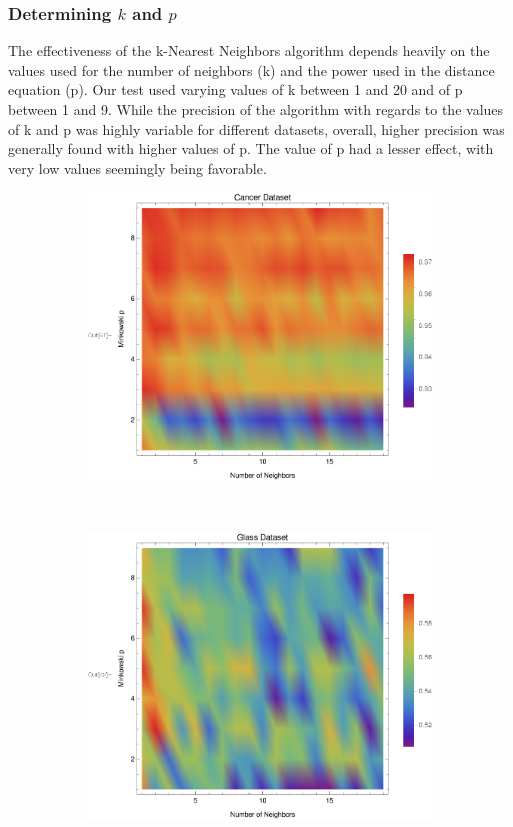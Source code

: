 \documentclass{article}
\begin{document}
		\subsubsection{Determining $k$ and $p$}
			The effectiveness of the k-Nearest Neighbors algorithm depends heavily on the values used for the number of neighbors (k) and the power used in the distance equation (p).  Our test used varying values of k between 1 and 20 and of p between 1 and 9.  While the precision of the algorithm with regards to the values of k and p was highly variable for different datasets, overall, higher precision was generally found with higher values of p.  The value of p had a lesser effect, with very low values seemingly being favorable.
			\begin{figure}[h!]
				\centering
				\begin{subfigure}[b]{0.32\textwidth}
					\centering
					\includegraphics[width=\textwidth]{figs/kNN/cancer_plot_kp}	
					\caption{}
					\label{kp_cancer}				
				\end{subfigure}	\	
				\begin{subfigure}[b]{0.32\textwidth}
					\centering
					\includegraphics[width=\textwidth]{figs/kNN/glass_plot_kp}

\end{subfigure}
\end{figure}
\end{document}
